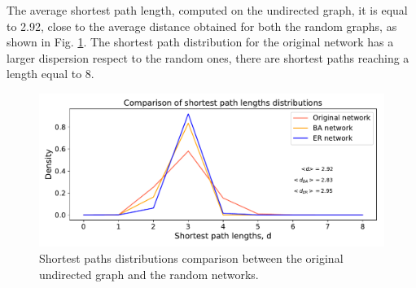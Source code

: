 \documentclass[11pt, twoside]{report}
\begin{document}
The average shortest path length, computed on the undirected graph, it is equal to 2.92, close to the average distance
obtained for both the random graphs, as shown in Fig. \ref{fig:path_comparison}.
The shortest path distribution for the original network has a larger dispersion respect to the random ones, there are shortest paths
reaching a length equal to 8.



    \begin{figure}[htbp]
      \centering
      \includegraphics[width=\textwidth]{../../scripts/network_analysis/imgs/paths_hist_comparison.pdf}
      \caption{Shortest paths distributions comparison between the original undirected graph and the random networks.}
      \label{fig:path_comparison}
    \end{figure}
\end{document}
